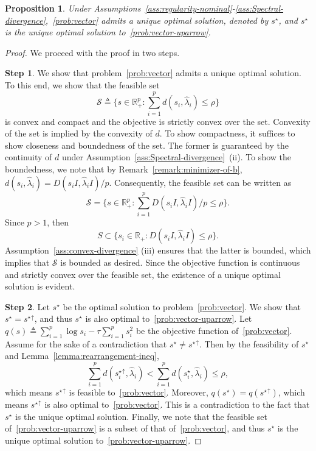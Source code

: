 \documentclass[11pt]{article}
\def\R{\mathbb{R}}
\newtheorem{proposition}{Proposition}
\newcommand{\opt}{^\star}
\newcommand{\Let}{\triangleq}
\def\R{\mathbb{R}}
\newcommand{\wh}{\widehat}
\begin{document}
\begin{proposition}
\label{Prop:P-Vec==P-Vec_uparrow}
    Under Assumptions~\ref{ass:regularity-nominal}-\ref{ass:Spectral-divergence},~\eqref{prob:vector} admits a unique optimal solution, denoted by $s\opt$, and $s\opt$ is the unique optimal solution to~\eqref{prob:vector-uparrow}.
\end{proposition}
\begin{proof}
    We proceed with the proof in two steps.

    \textbf{Step 1}. We show that problem~\eqref{prob:vector} admits a unique optimal solution. To this end, we show that the feasible set 
    $$
    \mathcal{S}\Let\{s\in\R^p_+:\sum_{i=1}^p d(s_i,\wh\lambda_i)\leq  \rho\}
    $$ 
    is convex and compact and the objective is strictly convex over the set. Convexity of the set is implied by the convexity of $d$. To show compactness, it suffices to show closeness and boundedness of the set. The former is guaranteed by the continuity of $d$ under Assumption~\ref{ass:Spectral-divergence}~(ii). To show the boundedness, we note that by Remark~\ref{remark:minimizer-of-b}, $d(s_i,\wh\lambda_i) = D(s_i I, \wh\lambda_i I) / p$. Consequently, the feasible set can be written as $$
    \mathcal{S}=\{s\in\R^p_+:\sum_{i=1}^p D(s_i I, \wh\lambda_i I) / p\leq  \rho\}.
    $$
    Since $p>1$, then 
    $$
    S\subset \{s_i\in\R_+: D(s_i I,\wh\lambda_i I)\leq  \rho\}.
    $$
    Assumption~\ref{ass:convex-divergence} (iii) ensures that the latter is bounded, which implies that $\mathcal{S}$ is bounded as desired. Since the objective function is continuous and strictly convex over the feasible set, the existence of a unique optimal solution is evident. 

    \textbf{Step 2}. Let $s\opt$ be the optimal solution to problem~\eqref{prob:vector}.
    We show that $s\opt={s\opt}^{\uparrow}$, and thus $s\opt$ is also optimal to~\eqref{prob:vector-uparrow}. Let $q(s)\Let \sum_{i=1}^p \log s_i - \tau \sum_{i=1}^p s_i^2$ be the objective function of~\eqref{prob:vector}. Assume for the sake of a contradiction that $s\opt\neq {s\opt}^\uparrow$. Then by the feasibility of $s\opt$ and Lemma~\ref{lemma:rearrangement-ineq}, 
    \begin{equation}
        \sum_{i=1}^p d({{s_i\opt}^\uparrow}, \widehat{\lambda}_i)<  \sum_{i=1}^p d({{s_i\opt}}, \widehat{\lambda}_i)\leq   \rho,
    \end{equation}
    which means ${s\opt}^\uparrow$ is feasible to~\eqref{prob:vector}. Moreover, $q(s\opt)=q({s\opt}^\uparrow)$, which means ${s\opt}^\uparrow$ is also optimal to~\eqref{prob:vector}. This is a contradiction to the fact that $s\opt$ is the unique optimal solution. Finally, we note that the feasible set of~\eqref{prob:vector-uparrow} is a subset of that of~\eqref{prob:vector}, and thus $s\opt$ is the unique optimal solution to~\eqref{prob:vector-uparrow}.
\end{proof}
\end{document}
